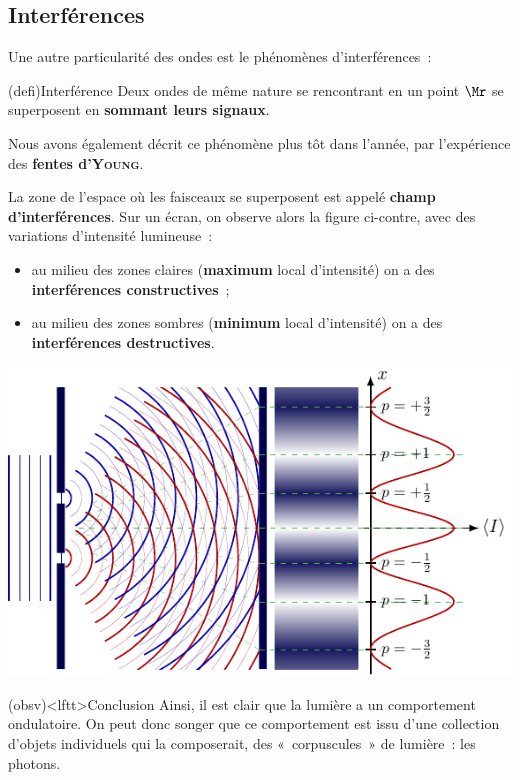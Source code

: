 \documentclass[../../main/main.tex]{subfiles}
\begin{document}
\subsection{Interférences}
\label{ssec:ondeint}
Une autre particularité des ondes est le phénomènes d'interférences~:
\begin{tcb*}(defi){Interférence}
	Deux ondes de même nature se rencontrant en un point $\Mr$ se superposent en
	\textbf{sommant leurs signaux}.
\end{tcb*}
Nous avons également décrit ce phénomène plus tôt dans l'année, par l'expérience
des \textbf{fentes d'\textsc{Young}}.
\bigbreak
\noindent
\begin{minipage}{0.45\linewidth}
	La zone de l'espace où les faisceaux se superposent est appelé \textbf{champ
		d'interférences}. Sur un écran, on observe alors la figure ci-contre, avec
	des variations d'intensité lumineuse~:
	\begin{itemize}
		\item au milieu des zones claires (\textbf{maximum} local d'intensité)
		      on a des \textbf{interférences constructives}~;
		\item au milieu des zones sombres (\textbf{minimum} local d'intensité)
		      on a des \textbf{interférences destructives}.
	\end{itemize}
\end{minipage}
\hfill
\begin{minipage}{0.50\linewidth}
	\begin{center}
		\includegraphics[width=\linewidth]{young_result}
	\end{center}
\end{minipage}

\begin{tcn}(obsv)<lftt>{Conclusion}
	Ainsi, il est clair que la lumière a un comportement ondulatoire. On peut donc
	songer que ce comportement est issu d'une collection d'objets individuels qui
	la composerait, des «~corpuscules~» de lumière~: les photons.
\end{tcn}
\end{document}
